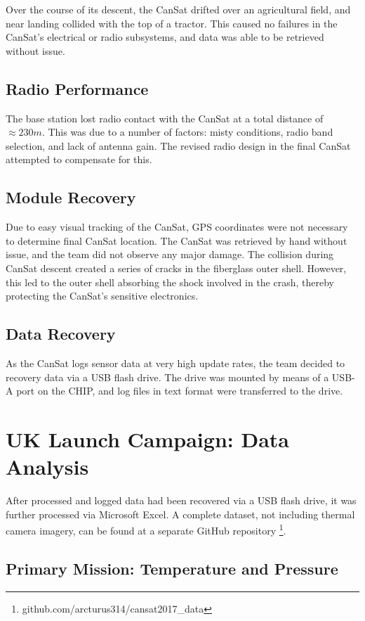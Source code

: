 \documentclass[]{report}
\begin{document}
	Over the course of its descent, the CanSat drifted over an agricultural field, and near landing collided with the top of a tractor. This caused no failures in the CanSat's electrical or radio subsystems, and data was able to be retrieved without issue.
	
	\subsection{Radio Performance}
	The base station lost radio contact with the CanSat at a total distance of $\approx230m$. This was due to a number of factors: misty conditions, radio band selection, and lack of antenna gain. The revised radio design in the final CanSat attempted to compensate for this.
	
	\subsection{Module Recovery}
	Due to easy visual tracking of the CanSat, GPS coordinates were not necessary to determine final CanSat location. The CanSat was retrieved by hand without issue, and the team did not observe any major damage. The collision during CanSat descent created a series of cracks in the fiberglass outer shell. However, this led to the outer shell absorbing the shock involved in the crash, thereby protecting the CanSat's sensitive electronics.
	
	\subsection{Data Recovery}
	As the CanSat logs sensor data at very high update rates, the team decided to recovery data via a USB flash drive. The drive was mounted by means of a USB-A port on the CHIP, and log files in text format were transferred to the drive.
	
	
	\section{UK Launch Campaign: Data Analysis}
	After processed and logged data had been recovered via a USB flash drive, it was further processed via Microsoft Excel. A complete dataset, not including thermal camera imagery, can be found at a separate GitHub repository \footnote{github.com/arcturus314/cansat2017\_data}.
	
	\subsection{Primary Mission: Temperature and Pressure}
	
\end{document}

